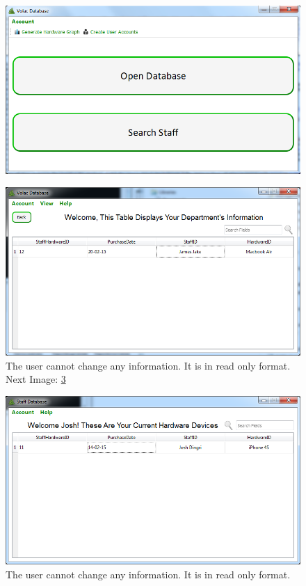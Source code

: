\begin{figure}[H]
    \includegraphics[width=\textwidth]{./Testing/Images/AdminInterface.png}\label{fig:AdminNewPassword}
\end{figure}

\begin{figure}[H]
    \includegraphics[width=\textwidth]{./Testing/Images/ManagerNoChange.png}
    \caption{The user cannot change any information. It is in read only format. Next Image: \ref{fig:StaffNoChange}} \label{fig:ManagerNoChange}
\end{figure}

\begin{figure}[H]
    \includegraphics[width=\textwidth]{./Testing/Images/StaffNoChange.png}
    \caption{The user cannot change any information. It is in read only format.} \label{fig:StaffNoChange}
\end{figure}

